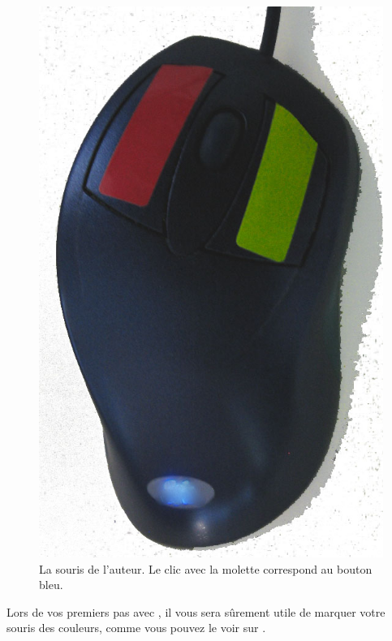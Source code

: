 \documentclass[a4paper,10pt,twoside]{book}
\begin{document}
\begin{figure}
\includegraphics[width=0.95\linewidth]{colouredMouse}
\caption{La souris de l'auteur. Le clic avec la molette correspond au bouton bleu.\label{fig:colouredMouse}}
\end{figure}
 
Lors de vos premiers pas avec \sq, il vous sera sûrement utile de
marquer votre souris des couleurs, comme vous pouvez le voir sur .
\end{document}
